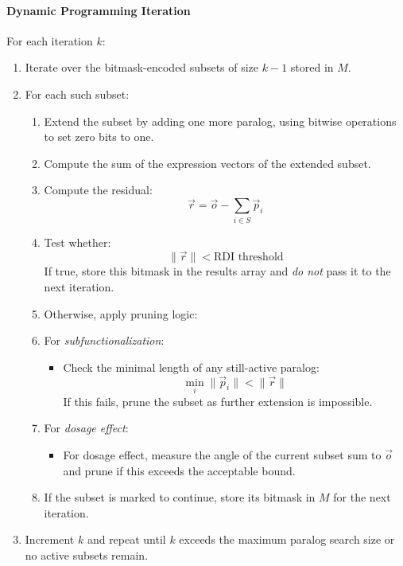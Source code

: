 \documentclass{article}
\begin{document}
\paragraph{Dynamic Programming Iteration}
For each iteration $k$:
\begin{enumerate}
    \item Iterate over the bitmask-encoded subsets of size $k-1$ stored in $M$.
    \item For each such subset:
      \begin{enumerate}
        \item Extend the subset by adding one more paralog, using bitwise operations to set zero bits to one.
        \item Compute the sum of the expression vectors of the extended subset.
        \item Compute the residual:
          \[
            \vec{r} = \vec{o} - \sum_{i \in S} \vec{p}_i
          \]
        \item Test whether:
          \[
            \|\vec{r}\| < \text{RDI threshold}
          \]
          If true, store this bitmask in the results array and \emph{do not} pass it to the next iteration.
        \item Otherwise, apply pruning logic:
        \item For \emph{subfunctionalization}:
          \begin{itemize}
            \item Check the minimal length of any still-active paralog:
              \[
                \min_{i} \|\vec{p}_i\| < \|\vec{r}\|
              \]
              If this fails, prune the subset as further extension is impossible.
          \end{itemize}
        \item For \emph{dosage effect}:
          \begin{itemize}
            \item For dosage effect, measure the angle of the current subset sum to $\vec{o}$ and prune if this exceeds the acceptable bound.
          \end{itemize}
        \item If the subset is marked to continue, store its bitmask in $M$ for the next iteration.
      \end{enumerate}
    \item Increment $k$ and repeat until $k$ exceeds the maximum paralog search size or no active subsets remain.
\end{enumerate}
\end{document}
